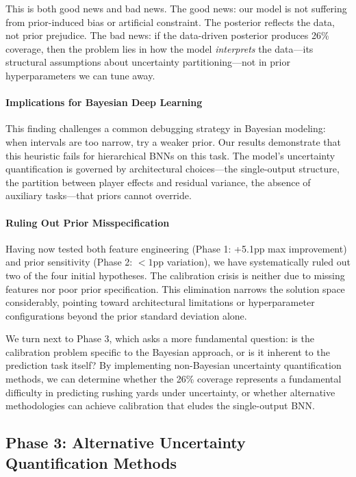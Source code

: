 This is both good news and bad news. The good news: our model is not suffering from prior-induced bias or artificial constraint. The posterior reflects the data, not prior prejudice. The bad news: if the data-driven posterior produces 26\% coverage, then the problem lies in how the model \textit{interprets} the data—its structural assumptions about uncertainty partitioning—not in prior hyperparameters we can tune away.

\paragraph{Implications for Bayesian Deep Learning}

This finding challenges a common debugging strategy in Bayesian modeling: when intervals are too narrow, try a weaker prior. Our results demonstrate that this heuristic fails for hierarchical BNNs on this task. The model's uncertainty quantification is governed by architectural choices—the single-output structure, the partition between player effects and residual variance, the absence of auxiliary tasks—that priors cannot override.

\paragraph{Ruling Out Prior Misspecification}

Having now tested both feature engineering (Phase 1: +5.1pp max improvement) and prior sensitivity (Phase 2: $<1$pp variation), we have systematically ruled out two of the four initial hypotheses. The calibration crisis is neither due to missing features nor poor prior specification. This elimination narrows the solution space considerably, pointing toward architectural limitations or hyperparameter configurations beyond the prior standard deviation alone.

We turn next to Phase 3, which asks a more fundamental question: is the calibration problem specific to the Bayesian approach, or is it inherent to the prediction task itself? By implementing non-Bayesian uncertainty quantification methods, we can determine whether the 26\% coverage represents a fundamental difficulty in predicting rushing yards under uncertainty, or whether alternative methodologies can achieve calibration that eludes the single-output BNN.

\subsection{Phase 3: Alternative Uncertainty Quantification Methods}
\label{subsec:phase3_alternatives}

